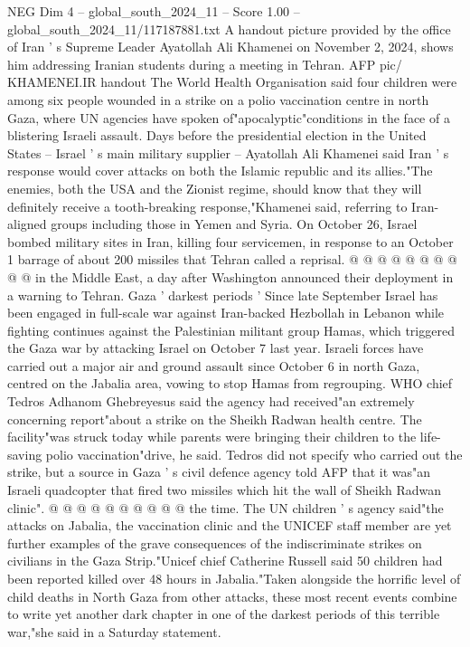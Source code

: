 \begin{textsample}{NEG Dim 4 – global\_south\_2024\_11 – Score 1.00 – global\_south\_2024\_11/117187881.txt}  \label{ex:f4_neg_210}
A handout picture provided by the office of Iran ' s Supreme Leader Ayatollah Ali Khamenei on November 2, 2024, shows him addressing Iranian students during a meeting in Tehran.
AFP pic/ KHAMENEI.IR handout The World Health Organisation said four children were among six people wounded in a strike on a polio vaccination centre in north Gaza, where UN agencies have spoken of"apocalyptic"conditions in the face of a blistering Israeli assault.
Days before the presidential election in the United States -- Israel ' s main military supplier -- Ayatollah Ali Khamenei said Iran ' s response would cover attacks on both the Islamic republic and its allies."The enemies, both the USA and the Zionist regime, should know that they will definitely receive a tooth-breaking response,"Khamenei said, referring to Iran-aligned groups including those in Yemen and Syria.
On October 26, Israel bombed military sites in Iran, killing four servicemen, in response to an October 1 barrage of about 200 missiles that Tehran called a reprisal. @ @ @ @ @ @ @ @ @ @ in the Middle East, a day after Washington announced their deployment in a warning to Tehran.
Gaza ' darkest periods ' Since late September Israel has been engaged in full-scale war against Iran-backed Hezbollah in Lebanon while fighting continues against the Palestinian militant group Hamas, which triggered the Gaza war by attacking Israel on October 7 last year.
Israeli forces have carried out a major air and ground assault since October 6 in north Gaza, centred on the Jabalia area, vowing to stop Hamas from regrouping.
WHO chief Tedros Adhanom Ghebreyesus said the agency had received"an extremely concerning report"about a strike on the Sheikh Radwan health centre.
The facility"was struck today while parents were bringing their children to the life-saving polio vaccination"drive, he said.
Tedros did not specify who carried out the strike, but a source in Gaza ' s civil defence agency told AFP that it was"an Israeli quadcopter that fired two missiles which hit the wall of Sheikh Radwan clinic". @ @ @ @ @ @ @ @ @ @ the time.
The UN children ' s agency said"the attacks on Jabalia, the vaccination clinic and the UNICEF staff member are yet further examples of the grave consequences of the indiscriminate strikes on civilians in the Gaza Strip."Unicef chief Catherine Russell said 50 children had been reported killed over 48 hours in Jabalia."Taken alongside the horrific level of child deaths in North Gaza from other attacks, these most recent events combine to write yet another dark chapter in one of the darkest periods of this terrible war,"she said in a Saturday statement.

\end{textsample}
